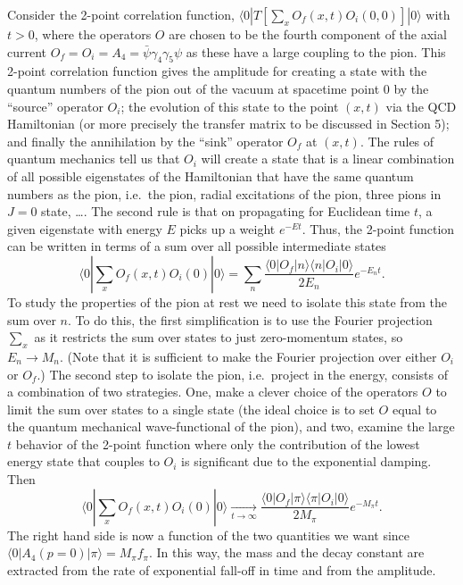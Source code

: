 Consider the 2-point correlation function, $\langle 0| T \left[ \sum_x O_f(x, t) O_i(0, 0) \right] |0\rangle$
with $t > 0$, where the operators $O$ are chosen to be the fourth component of
the axial current $O_f = O_i = A_4 = \bar{\psi}\gamma_4\gamma_5\psi$ as these have a large coupling to
the pion. This 2-point correlation function gives the amplitude for creating
a state with the quantum numbers of the pion out of the vacuum at spacetime point $0$ by the ``source'' operator $O_i$; the evolution of this state to
the point $(x, t)$ via the QCD Hamiltonian (or more precisely the transfer
matrix to be discussed in Section 5); and finally the annihilation by the
``sink'' operator $O_f$ at $(x, t)$. The rules of quantum mechanics tell us that
$O_i$ will create a state that is a linear combination of all possible eigenstates
of the Hamiltonian that have the same quantum numbers as the pion, i.e.\
the pion, radial excitations of the pion, three pions in $J = 0$ state, \ldots.
The second rule is that on propagating for Euclidean time $t$, a given eigenstate
with energy $E$ picks up a weight $e^{-Et}$. Thus, the 2-point function can be
written in terms of a sum over all possible intermediate states
\begin{equation}
  \langle 0| \sum_x O_f(x, t) O_i(0) |0\rangle
  = \sum_n \frac{\langle 0|O_f|n\rangle\langle n|O_i|0\rangle}{2E_n} e^{-E_n t}.
  \label{eq:2pt_spectral}
\end{equation}
To study the properties of the pion at rest we need to isolate this state from
the sum over $n$. To do this, the first simplification is to use the Fourier
projection $\sum_x$ as it restricts the sum over states to just zero-momentum
states, so $E_n \to M_n$. (Note that it is sufficient to make the Fourier projection over either $O_i$ or $O_f$.) The second step to isolate the pion, i.e.\
project in the energy, consists of a combination of two strategies. One,
make a clever choice of the operators $O$ to limit the sum over states to a
single state (the ideal choice is to set $O$ equal to the quantum mechanical
wave-functional of the pion), and two, examine the large $t$ behavior of the
2-point function where only the contribution of the lowest energy state that
couples to $O_i$ is significant due to the exponential damping. Then
\begin{equation}
  \langle 0| \sum_x O_f(x, t) O_i(0) |0\rangle
  \xrightarrow[t\to\infty]{}
  \frac{\langle 0|O_f|\pi\rangle\langle\pi|O_i|0\rangle}{2M_\pi} e^{-M_\pi t}.
  \label{eq:2pt_pion}
\end{equation}
The right hand side is now a function of the two quantities we want since
$\langle 0|A_4(p = 0)|\pi\rangle = M_\pi f_\pi$. In this way, the mass and the decay constant
are extracted from the rate of exponential fall-off in time and from the
amplitude.

